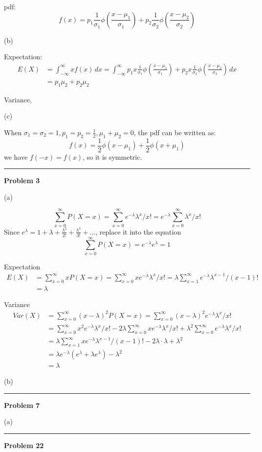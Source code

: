 \documentclass[letterpaper, 11pt]{article}
\newcommand{\1}{\mathds{1}}	%
\theoremstyle{definition}
\begin{document}
pdf:
\[
    f(x) = p_1 \frac{1}{\sigma_1} \phi (\frac{x - \mu_1}{\sigma_1}) + p_2 \frac{1}{\sigma_2} \phi (\frac{x - \mu_2}{\sigma_2})
\]

(b)

Expectation: \begin{align*}
    E(X) & = \int_{-\infty }^{\infty } xf(x) \, dx = \int_{-\infty }^{\infty } p_1 x\frac{1}{\sigma_1} \phi (\frac{x - \mu_1}{\sigma_1}) + p_2 x\frac{1}{\sigma_2} \phi (\frac{x - \mu_2}{\sigma_2})  \, dx \\
         & = p_1 \mu_2 + p_2 \mu_2
\end{align*}

Variance, %

(c)

When $\sigma_1 = \sigma_2 = 1, p_1 = p_2 = \frac{1}{2}, \mu_1 + \mu_2 = 0$, the pdf can be written as:
\[
    f(x) = \frac{1}{2}  \phi ({x - \mu_1}) + \frac{1}{2} \phi ({x + \mu_1})
\]
we have $f(-x) = f(x)$, so it is symmetric.


\bigskip
\hrule
\bigskip


\textbf{Problem 3}

(a)

\[
    \sum_{x=0}^{\infty } P(X=x) = \sum_{x=0}^{\infty } e^{-\lambda}\lambda^{x}/x! = e^{-\lambda} \sum_{x=0}^{\infty }\lambda^x/x!
\]
Since $e^\lambda = 1 + \lambda + \frac{\lambda ^{2}}{2!} + \frac{\lambda ^{3}}{3!} + \dots$, replace it into the equation \[
    \sum_{x=0}^{\infty } P(X=x) =  e^{-\lambda}  e^{\lambda} = 1
\]

Expectation \begin{align*}
    E(X) & = \sum_{x=0}^{\infty } xP(X=x) = \sum_{x=0}^{\infty } x e^{-\lambda}\lambda^{x}/x! = \lambda \sum_{x=1}^{\infty } e^{-\lambda}\lambda^{x -1}/(x-1)! \\
         & = \lambda
\end{align*}

Variance \begin{align*}
    Var(X) & = \sum_{x=0}^{\infty } (x-\lambda)^{2} P(X=x) = \sum_{x=0}^{\infty } (x-\lambda)^{2}  e^{-\lambda}\lambda^{x}/x! \\
    & = \sum_{x=0}^{\infty } x ^{2} e^{-\lambda}\lambda^{x}/x! 
    -2 \lambda\sum_{x=0}^{\infty } x  e^{-\lambda}\lambda^{x}/x! 
    + \lambda ^{2} \sum_{x=0}^{\infty } e^{-\lambda}\lambda^{x}/x! \\
    & = \lambda \sum_{x=1}^{\infty } x e^{-\lambda}\lambda^{x-1}/(x-1)! -2\lambda \cdot \lambda + \lambda ^{2} \\ 
    & = \lambda e^{-\lambda} (e^{\lambda} + \lambda e^{\lambda}) - \lambda ^{2} \\
    & = \lambda
\end{align*}

(b)



\bigskip
\hrule
\bigskip

\textbf{Problem 7}

(a)



\bigskip
\hrule
\bigskip

\textbf{Problem 22}





\end{document}
